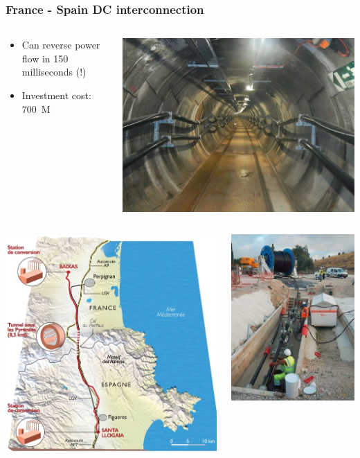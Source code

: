 \begin{frame}
\frametitle{France - Spain DC interconnection}
\begin{columns}
\begin{column}{0.5\linewidth}
\begin{itemize}
    \item Can reverse power flow in 150 milliseconds (!)
    \item Investment cost: \SI{700}{M\text{\texteuro}}
\end{itemize}
\end{column}
\begin{column}{0.5\linewidth}
\begin{center}
    \includegraphics[width=0.4\linewidth]{images/tunnel_pyrenees.jpg}
\end{center}
\end{column}
\end{columns}
\begin{columns}
\begin{column}{0.5\linewidth}
\begin{center}
    \includegraphics[width=0.5\linewidth]{images/int_France_Espagne.jpg}
\end{center}
\end{column}
\begin{column}{0.5\linewidth}
\begin{center}
    \includegraphics[width=0.4\linewidth]{images/cable_pyrenees.jpg}

\end{center}
\end{column}
\end{columns}
\end{frame}
